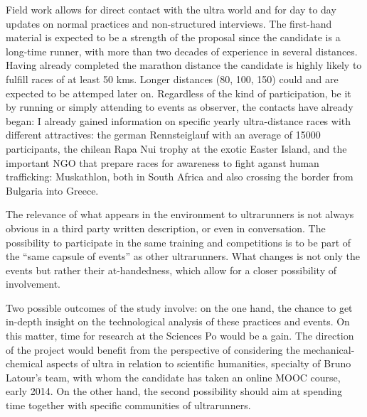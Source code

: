 Field work allows for direct contact with the ultra world and for day to day updates on normal practices and non-structured interviews. The first-hand material is expected to be a strength of the proposal since the candidate is a long-time runner, with more than two decades of experience in several distances. Having already completed the marathon distance the candidate is highly likely to fulfill races of at least 50 kms. Longer distances (80, 100, 150) could and are expected to be attemped later on. 
Regardless of the kind of participation, be it by running or simply attending to events as observer, the contacts have already began: I already gained information on specific yearly ultra-distance races with different attractives:
the german Rennsteiglauf with an average of 15000 participants, the chilean Rapa Nui trophy at the exotic Easter Island,
and the important NGO that prepare races for awareness to fight aganst human trafficking: Muskathlon, both in South Africa and also crossing the border from Bulgaria into Greece.

The relevance of what appears in the environment to ultrarunners is not always obvious in a third party written description, or even in conversation. The possibility to participate in the same training and competitions is to be part of the “same capsule of events” as other ultrarunners. What changes is not only the events but rather their at-handedness, which allow for a closer possibility of involvement.

Two possible outcomes of the study involve: on the one hand, the chance to get in-depth insight on the technological analysis of these practices and events. On this matter, time for research at the Sciences Po would be a gain. 
The direction of the project would benefit from the perspective of considering the mechanical-chemical aspects of ultra in relation to scientific humanities, specialty of Bruno Latour’s team, with whom the candidate has taken an online MOOC course, early 2014. On the other hand, the second possibility should aim at spending time together with specific communities of ultrarunners.

